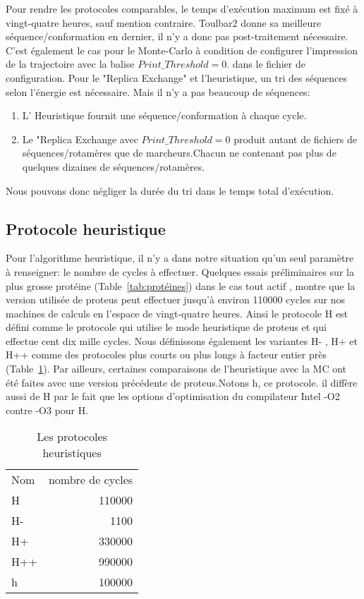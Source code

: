Pour rendre les protocoles comparables, le temps d'exécution maximum est fixé à vingt-quatre heures, sauf mention contraire.
Toulbar2 donne sa meilleure séquence/conformation en dernier, il n'y a donc pas post-traitement nécessaire.
C'est également le cas pour le Monte-Carlo à condition de configurer l'impression de la trajectoire avec la balise $Print\_Threshold=0$. dans le fichier de configuration.
Pour le "Replica Exchange" et l'heuristique, un tri des séquences selon l'énergie est nécessaire. Mais il n'y a pas beaucoup de séquences: 
\begin{enumerate}
\item L' Heuristique fournit une séquence/conformation à chaque cycle.
\item Le "Replica Exchange avec $Print\_Threshold=0$ produit autant de fichiers de séquences/rotamères que de marcheurs.Chacun ne contenant pas plus de quelques dizaines de séquences/rotamères. 
\end{enumerate}

Nous pouvons donc négliger la durée du tri dans le temps total d'exécution.    


\subsection{Protocole heuristique}

Pour l'algorithme heuristique, il n'y a dans notre situation qu'un seul paramètre à renseigner: le nombre de cycles à effectuer. Quelques essais préliminaires sur la plus grosse protéine (Table~\ref{tab:protéines}) dans le cas tout actif , montre que la version utilisée de proteus peut effectuer jusqu'à environ 110000 cycles sur nos machines de calculs en l'espace de vingt-quatre heures. Ainsi le protocole H est défini comme le protocole qui utilise le mode heuristique de proteus et qui effectue cent dix mille cycles. Nous définissons également les variantes H- , H+ et H++ comme des protocoles plus courts ou plus longs à facteur entier près (Table~\ref{tab:protoH}). Par ailleurs, certaines comparaisons de l'heuristique avec la MC ont été faites avec une version précédente de proteus.Notons h, ce protocole. il diffère  aussi de H par le fait que les options d'optimisation du compilateur Intel -O2 contre -O3 pour H.    


    \begin{table}[!htbp]
      \centering

      \begin{tabular}{lr}

        \toprule
        Nom & nombre de cycles \\
        \cmidrule{1-2}
        H   & 110000 \\  
        H-  & 1100   \\  
        H+  & 330000 \\  
        H++ & 990000 \\  
        h   & 100000 \\  
        \bottomrule

      \end{tabular}      
      \caption{Les protocoles heuristiques}
\label{tab:protoH}      
    \end{table}

